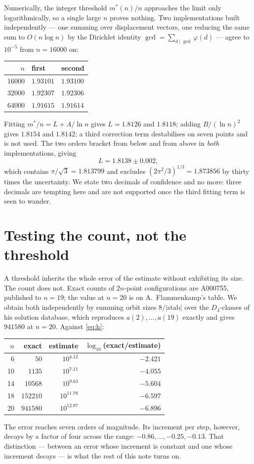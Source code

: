 \documentclass[11pt,a4paper]{article}
\begin{document}
Numerically, the integer threshold $m^*(n)/n$ approaches the limit only logarithmically, so a
single large $n$ proves nothing.  Two implementations built independently --- one summing over
displacement vectors, one reducing the same sum to $O(n\log n)$ by the Dirichlet identity
$\gcd=\sum_{d\mid\gcd}\varphi(d)$ --- agree to $10^{-5}$ from $n=16000$ on:
\begin{center}
\begin{tabular}{rll}
\toprule
$n$ & first & second\\
\midrule
16000 & $1.93101$ & $1.93100$\\
32000 & $1.92307$ & $1.92306$\\
64000 & $1.91615$ & $1.91614$\\
\bottomrule
\end{tabular}
\end{center}
Fitting $m^*/n=L+A/\ln n$ gives $L=1.8126$ and $1.8118$; adding $B/(\ln n)^2$ gives $1.8154$ and
$1.8142$; a third correction term destabilises on seven points and is not used.  The two orders
bracket from below and from above in \emph{both} implementations, giving
\[L=1.8138\pm0.002,\]
which contains $\pi/\sqrt3=1.813799$ and excludes $(2\pi^2/3)^{1/3}=1.873856$ by thirty times the
uncertainty.  We state two decimals of confidence and no more: three decimals are tempting here and
are not supported once the third fitting term is seen to wander.

\section{Testing the count, not the threshold}
A threshold inherits the whole error of the estimate without exhibiting its size.  The count does
not.  Exact counts of $2n$-point configurations are A000755, published to $n=19$; the value at
$n=20$ is on A.~Flammenkamp's table.  We obtain both independently by summing orbit sizes
$8/|\mathrm{stab}|$ over the $D_4$-classes of his solution database, which reproduces
$a(2),\dots,a(19)$ exactly and gives $941580$ at $n=20$.  Against \eqref{eq:h}:
\begin{center}
\begin{tabular}{rrrr}
\toprule
$n$ & exact & estimate & $\log_{10}$(exact/estimate) \\
\midrule
 6 & $50$      & $10^{4.12}$  & $-2.421$\\
10 & $1135$    & $10^{7.11}$  & $-4.055$\\
14 & $10568$   & $10^{9.63}$  & $-5.604$\\
18 & $152210$  & $10^{11.78}$ & $-6.597$\\
20 & $941580$  & $10^{12.87}$ & $-6.896$\\
\bottomrule
\end{tabular}
\end{center}
The error reaches seven orders of magnitude.  Its increment per step, however, decays by a factor
of four across the range: $-0.86,\dots,-0.25,-0.13$.  That distinction --- between an error whose
increment is constant and one whose increment decays --- is what the rest of this note turns on.
\end{document}
